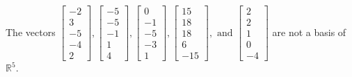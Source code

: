 \begin{exercise}
\begin{exerciseStatement}
  \end{exerciseStatement}
  \begin{exerciseAnswer}
   The vectors \(\left[\begin{array}{r}
-2 \\
3 \\
-5 \\
-4 \\
2
\end{array}\right] , \left[\begin{array}{r}
-5 \\
-5 \\
-1 \\
1 \\
4
\end{array}\right] , \left[\begin{array}{r}
0 \\
-1 \\
-5 \\
-3 \\
1
\end{array}\right] , \left[\begin{array}{r}
15 \\
18 \\
18 \\
6 \\
-15
\end{array}\right] , \text{ and } \left[\begin{array}{r}
2 \\
2 \\
1 \\
0 \\
-4
\end{array}\right]\) 
  	 are not  a basis of \(\mathbb{R}^5\).
  


  \end{exerciseAnswer}
\end{exercise}